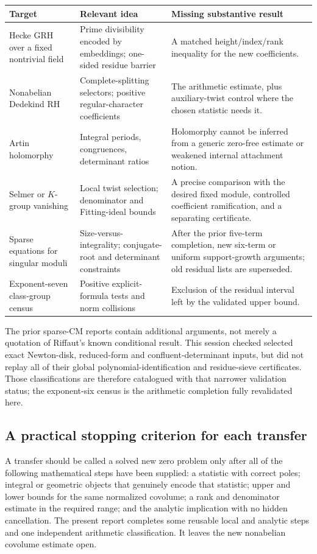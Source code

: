 \begin{longtable}{@{}p{}p{}p{}@{}}
\toprule
Target & Relevant idea & Missing substantive result\\
\midrule
\endhead
Hecke GRH over a fixed nontrivial field & Prime divisibility encoded by embeddings; one-sided residue barrier & A matched height/index/rank inequality for the new coefficients.\\[4pt]
Nonabelian Dedekind RH & Complete-splitting selectors; positive regular-character coefficients & The arithmetic estimate, plus auxiliary-twist control where the chosen statistic needs it.\\[4pt]
Artin holomorphy & Integral periods, congruences, determinant ratios & Holomorphy cannot be inferred from a generic zero-free estimate or weakened internal attachment notion.\\[4pt]
Selmer or $K$-group vanishing & Local twist selection; denominator and Fitting-ideal bounds & A precise comparison with the desired fixed module, controlled coefficient ramification, and a separating certificate.\\[4pt]
Sparse equations for singular moduli & Size-versus-integrality; conjugate-root and determinant constraints & After the prior five-term completion, new six-term or uniform support-growth arguments; old residual lists are superseded.\\[4pt]
Exponent-seven class-group census & Positive explicit-formula tests and norm collisions & Exclusion of the residual interval left by the validated upper bound.\\
\bottomrule
\end{longtable}

The prior sparse-CM reports contain additional arguments, not merely a quotation of Riffaut's known conditional result. This session checked selected exact Newton-disk, reduced-form and confluent-determinant inputs, but did not replay all of their global polynomial-identification and residue-sieve certificates. Those classifications are therefore catalogued with that narrower validation status; the exponent-six census is the arithmetic completion fully revalidated here.

\subsection{A practical stopping criterion for each transfer}

A transfer should be called a solved new zero problem only after all of the following mathematical steps have been supplied: a statistic with correct poles; integral or geometric objects that genuinely encode that statistic; upper and lower bounds for the same normalized covolume; a rank and denominator estimate in the required range; and the analytic implication with no hidden cancellation. The present report completes some reusable local and analytic steps and one independent arithmetic classification. It leaves the new nonabelian covolume estimate open.
